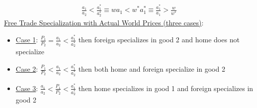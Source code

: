\documentclass{article}
\begin{document}
 \begin{gather*}
   \frac{a_{1}}{a_{2}} < \frac{a_{1}^{*}}{a_{2}^{*}} \equiv wa_{1} < w^{*}a_{1}^{*} \equiv \frac{a_{1}^{*}}{a_{1}} > \frac{w}{w^{*}}
 \end{gather*}
\underline{Free Trade Specialization with Actual World Prices (three cases)}:
\begin{itemize}
  \item  \underline{Case 1}: $\frac{P_{1}}{P_{2}} = \frac{a_{1}}{a_{2}} < \frac{a_{1}^{*}}{a_{2}^{*}}$ then foreign specializes in good 2 and home does not specialize
  \item  \underline{Case 2}: $\frac{P_{1}}{P_{2}} < \frac{a_{1}}{a_{2}} < \frac{a_{1}^{*}}{a_{2}^{*}}$ then both home and foreign specialize in good 2
  \item  \underline{Case 3}: $\frac{a_{1}}{a_{2}} < \frac{P_{1}}{P_{2}} < \frac{a_{1}^{*}}{a_{2}^{*}}$ then home specializes in good 1 and foreign specializes in good 2
\end{itemize}
\end{document}
